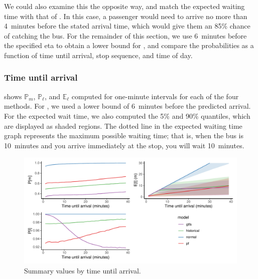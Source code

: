 We could also examine this the opposite way, and match the expected waiting time with that of \Fpf{}. In this case, a passenger would need to arrive no more than 4~minutes before the stated arrival time, which would give them an 85\% chance of catching the bus. For the remainder of this section, we use 6~minutes before the specified \gls{eta} to obtain a lower bound for \Fsched{}, and compare the probabilities as a function of time until arrival, stop sequence, and time of day.



\subsubsection{Time until arrival}

 shows $\mathbb{P}_m$, $\mathbb{P}_\ell$, and $\mathbb{E}_\ell$ computed for one-minute intervals for each of the four methods. For \Fsched{}, we used a lower bound of 6~minutes before the predicted arrival. For the expected wait time, we also computed the 5\% and 90\% quantiles, which are displayed as shaded regions. The dotted line in the expected waiting time graph represents the maximum possible waiting time; that is, when the bus is 10~minutes and you arrive immediately at the stop, you will wait 10~minutes.


\begin{knitrout}\small
{}\color{fgcolor}\begin{figure}
\includegraphics[width=\textwidth]{figure/model_results_pr_time-1} \caption[Summary values by time until arrival]{Summary values by time until arrival.}\label{fig:model_results_pr_time}
\end{figure}


\end{knitrout}



